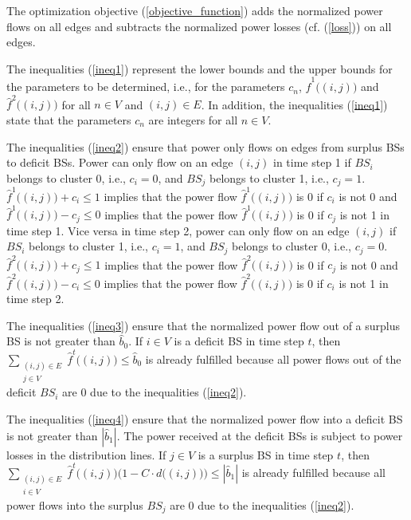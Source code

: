 The optimization objective (\ref{objective_function}) adds the normalized power flows on all edges and subtracts the normalized power losses (cf. (\ref{loss})) on all edges.


 The inequalities (\ref{ineq1}) represent the lower bounds and the upper bounds for the parameters to be determined, i.e., for the parameters $c_n$, $\hat{f}^1\big((i,j)\big)$ and $\hat{f}^2\big((i,j)\big)$ for all $n\in V$ and $(i,j)\in E$. In addition, the inequalities (\ref{ineq1}) state that the parameters $c_n$ are integers for all $n\in V$.

 The inequalities (\ref{ineq2}) ensure that power only flows on edges from surplus BSs to deficit BSs. Power can only flow on an edge $(i,j)$ in time step 1 if $BS_i$ belongs to cluster 0, i.e., $c_i=0$, and $BS_j$ belongs to cluster 1, i.e., $c_j=1$. $\hat{f}^1\big((i,j)\big) + c_i \leq 1$ implies that the power flow $\hat{f}^1\big((i,j)\big)$ is 0 if $c_i$ is not 0 and $\hat{f}^1\big((i,j)\big) - c_j \leq 0$ implies that the power flow $\hat{f}^1\big((i,j)\big)$ is 0 if $c_j$ is not 1 in time step 1. Vice versa in time step 2, power can only flow on an edge $(i,j)$ if $BS_i$ belongs to cluster 1, i.e., $c_i=1$, and $BS_j$ belongs to cluster 0, i.e., $c_j=0$. $\hat{f}^2\big((i,j)\big) + c_j \leq 1 $ implies that the power flow $\hat{f}^2\big((i,j)\big)$ is 0 if $c_j$ is not 0 and $\hat{f}^2\big((i,j)\big) - c_i \leq 0$ implies that the power flow $\hat{f}^2\big((i,j)\big)$ is 0 if $c_i$ is not 1 in time step 2.

The inequalities (\ref{ineq3}) ensure that the normalized power flow out of a surplus BS is not greater than $\hat{b}_0$. If $i\in V$ is a deficit BS in time step $t$, then $\sum_{\substack{(i,j) \in E\\ j\in V}} \hat{f}^t\big((i,j)\big)\leq \hat{b}_0$ is already fulfilled because all power flows out of the deficit $BS_i$ are 0 due to the inequalities (\ref{ineq2}). 


The inequalities (\ref{ineq4}) ensure that the normalized power flow into a deficit BS is not greater than $|\hat{b}_1|$. The power received at the deficit BSs is subject to power losses in the distribution lines. If $j\in V$ is a surplus BS in time step $t$, then $\sum_{\substack{ (i,j) \in E\\i\in V}} \hat{f}^t\big((i,j)\big)\big(1-C \cdot d\big((i,j)\big)\big)\leq |\hat{b}_1|$ is already fulfilled because all power flows into the surplus $BS_j$ are 0 due to the inequalities (\ref{ineq2}). 


